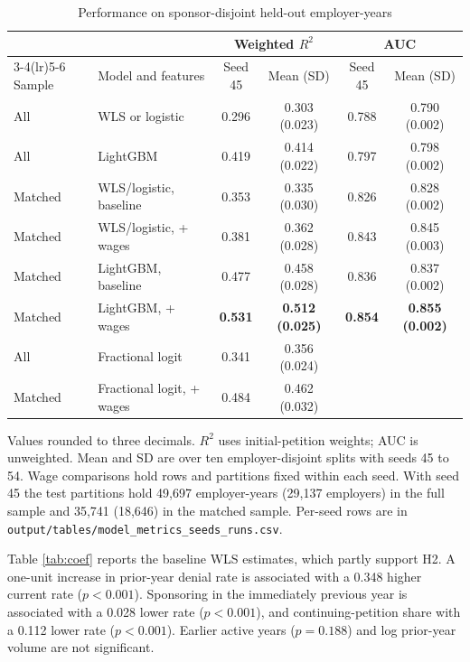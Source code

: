 \documentclass[9pt,twoside]{pnas-new}
\begin{document}
\begin{table}[t]
\centering
\caption{Performance on sponsor-disjoint held-out employer-years}
\label{tab:models}
\begin{minipage}{0.98\linewidth}
\centering
\begin{tabular}{llcccc}
\toprule
 & & \multicolumn{2}{c}{Weighted $R^2$} & \multicolumn{2}{c}{AUC} \\
\cmidrule(lr){3-4}\cmidrule(lr){5-6}
Sample & Model and features & Seed 45 & Mean (SD) & Seed 45 & Mean (SD) \\
\midrule
All & WLS or logistic & 0.296 & 0.303 (0.023) & 0.788 & 0.790 (0.002) \\
All & LightGBM & 0.419 & 0.414 (0.022) & 0.797 & 0.798 (0.002) \\
Matched & WLS/logistic, baseline & 0.353 & 0.335 (0.030) & 0.826 & 0.828 (0.002) \\
Matched & WLS/logistic, + wages & 0.381 & 0.362 (0.028) & 0.843 & 0.845 (0.003) \\
Matched & LightGBM, baseline & 0.477 & 0.458 (0.028) & 0.836 & 0.837 (0.002) \\
Matched & LightGBM, + wages & \textbf{0.531} & \textbf{0.512 (0.025)} & \textbf{0.854} & \textbf{0.855 (0.002)} \\
\addlinespace
All & Fractional logit & 0.341 & 0.356 (0.024) & & \\
Matched & Fractional logit, + wages & 0.484 & 0.462 (0.032) & & \\
\bottomrule
\end{tabular}
\par\smallskip
{\scriptsize Values rounded to three decimals. $R^2$ uses initial-petition weights; AUC is unweighted. Mean and SD are over ten employer-disjoint splits with seeds 45 to 54. Wage comparisons hold rows and partitions fixed within each seed. With seed 45 the test partitions hold 49,697 employer-years (29,137 employers) in the full sample and 35,741 (18,646) in the matched sample. Per-seed rows are in \texttt{output/tables/model\_metrics\_seeds\_runs.csv}.\par}
\end{minipage}
\end{table}

Table \ref{tab:coef} reports the baseline WLS estimates, which partly support H2. A one-unit increase in prior-year denial rate is associated with a 0.348 higher current rate ($p<0.001$). Sponsoring in the immediately previous year is associated with a 0.028 lower rate ($p<0.001$), and continuing-petition share with a 0.112 lower rate ($p<0.001$). Earlier active years ($p=0.188$) and log prior-year volume are not significant.
\end{document}
